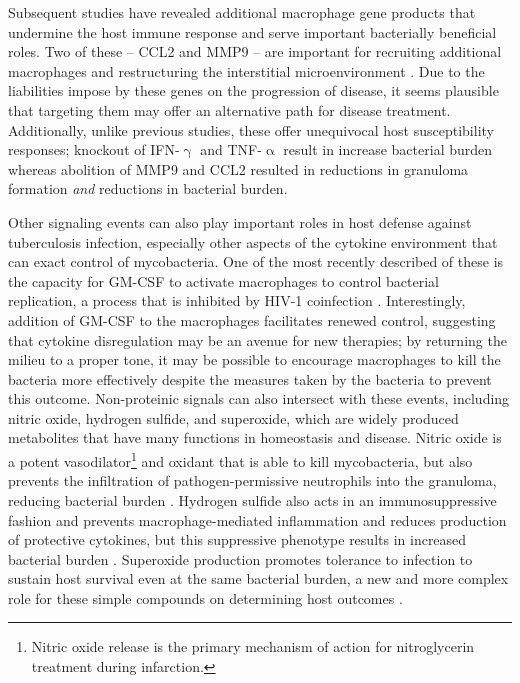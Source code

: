 Subsequent studies have revealed additional macrophage gene products that undermine the host immune response and serve important bacterially beneficial roles. Two of these -- CCL2 and MMP9 -- are important for recruiting additional macrophages and restructuring the interstitial microenvironment \citep{Cambier2014b, Volkman2010}. Due to the liabilities impose by these genes on the progression of disease, it seems plausible that targeting them may offer an alternative path for disease treatment. Additionally, unlike previous studies, these offer unequivocal host susceptibility responses; knockout of IFN\hyp{}$\upgamma$ and TNF\hyp{}$\upalpha$ result in increase bacterial burden whereas abolition of MMP9 and CCL2 resulted in reductions in granuloma formation \textit{and} reductions in bacterial burden.

Other signaling events can also play important roles in host defense against tuberculosis infection, especially other aspects of the cytokine environment that can exact control of mycobacteria. One of the most recently described of these is the capacity for GM\hyp{}CSF to activate macrophages to control bacterial replication, a process that is inhibited by HIV\hyp{}1 coinfection \citep{Bryson2019}. Interestingly, addition of GM\hyp{}CSF to the macrophages facilitates renewed control, suggesting that cytokine disregulation may be an avenue for new therapies; by returning the milieu to a proper tone, it may be possible to encourage macrophages to kill the bacteria more effectively despite the measures taken by the bacteria to prevent this outcome. Non\hyp{}proteinic signals can also intersect with these events, including nitric oxide, hydrogen sulfide, and superoxide, which are widely produced metabolites that have many functions in homeostasis and disease. Nitric oxide is a potent vasodilator\footnote{Nitric oxide release is the primary mechanism of action for nitroglycerin treatment during infarction.} and oxidant that is able to kill mycobacteria, but also prevents the infiltration of pathogen\hyp{}permissive neutrophils into the granuloma, reducing bacterial burden \citep{Mishra2017b, MacMicking1995, MacMicking1997a, MacMicking1997b, Szabo2007}. Hydrogen sulfide also acts in an immunosuppressive fashion and prevents macrophage\hyp{}mediated inflammation and reduces production of protective cytokines, but this suppressive phenotype results in increased bacterial burden \citep{Rahman2020}. Superoxide production promotes tolerance to infection to sustain host survival even at the same bacterial burden, a new and more complex role for these simple compounds on determining host outcomes \citep{Olive2018}.

